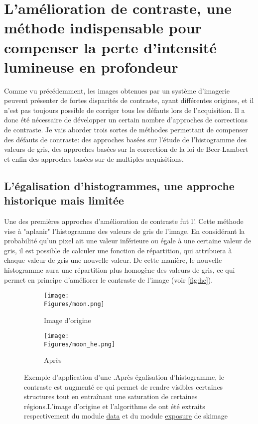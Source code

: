 \documentclass[\main/main.tex]{subfiles}
\begin{document}
            
\section{L'amélioration de contraste, une méthode indispensable pour compenser la perte d'intensité lumineuse en profondeur}    

%
Comme vu précédemment, les images obtenues par un système d'imagerie peuvent présenter de fortes disparités de contraste, ayant différentes origines, et il n'est pas toujours possible de corriger tous les défauts lors de l'acquisition.
%
Il a donc été nécessaire de développer un certain nombre d'approches de corrections de contraste.
%
Je vais aborder trois sortes de méthodes permettant de compenser des défauts de contraste: des approches basées sur l'étude de l'histogramme des valeurs de gris, des approches basées sur la correction de la loi de Beer-Lambert et enfin des approches basées sur de multiples acquisitions.

\subsection{L'égalisation d'histogrammes, une approche historique mais limitée}

%
Une des premières approches d'amélioration de contraste fut l'\he{}.
%
Cette méthode vise à "aplanir" l'histogramme des valeurs de gris de l'image.
%
En considérant la probabilité qu'un pixel ait une valeur inférieure ou égale à une certaine valeur de gris,
il est possible de calculer une fonction de répartition, qui attribuera à chaque valeur de gris une nouvelle valeur. De cette manière, le nouvelle histogramme aura une répartition plus homogène des valeurs de gris, ce qui permet en principe d'améliorer le contraste de l'image (voir \autoref{fig:he}).

\begin{figure}[h!]
    \centering
    \begin{subfigure}[b]{0.45\textwidth}
       \caption{
       Image d'origine
            }
       \centering \texttt{[image: \\Figures/moon.png]}
    \end{subfigure}
    \begin{subfigure}[b]{0.45\textwidth}
       \caption{
       Après \he{}
            }
       \centering \texttt{[image: \\Figures/moon\_he.png]}
    \end{subfigure}
    \caption{
        \label{fig:he}
        Exemple d'application d'une \he{}.\newline Après égalisation d'histogramme, le contraste est augmenté ce qui permet de rendre visibles certaines structures tout en entraînant une saturation de certaines régions.L'image d'origine et l'algorithme de \he{} ont été extraits respectivement du module \href{https://scikit-image.org/docs/dev/api/skimage.data.html#skimage.data.moon}{data} et du module \href{https://scikit-image.org/docs/dev/api/skimage.exposure.html}{exposure} de skimage}
\end{figure}
\end{document}
